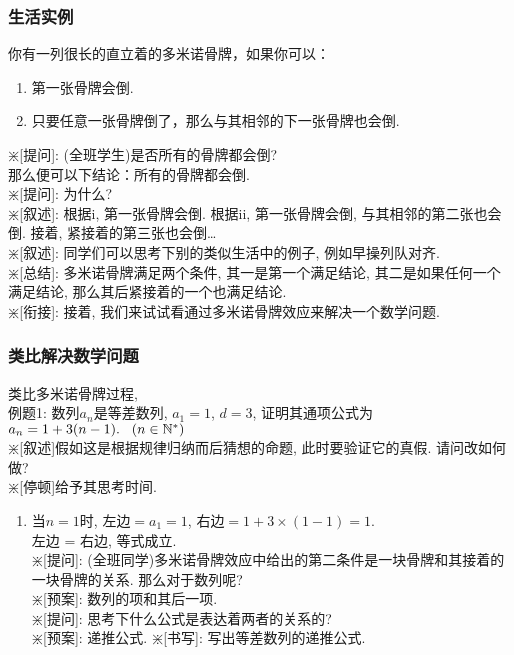 \documentclass{article}
\begin{document}
\begin{CJK}{UTF8}{gkai}
\subsubsection{生活实例}
你有一列很长的直立着的多米诺骨牌，如果你可以：
\begin{enumerate}[i]
\item 第一张骨牌会倒.
\item 只要任意一张骨牌倒了，那么与其相邻的下一张骨牌也会倒.
\end{enumerate}
$\divideontimes$[提问]: (全班学生)是否所有的骨牌都会倒?\\
那么便可以下结论：所有的骨牌都会倒.\\
$\divideontimes$[提问]: 为什么?\\
$\divideontimes$[叙述]: 根据i, 第一张骨牌会倒. 根据ii, 第一张骨牌会倒, 与其相邻的第二张也会倒. 接着, 紧接着的第三张也会倒\dots\\
$\divideontimes$[叙述]: 同学们可以思考下别的类似生活中的例子, 例如早操列队对齐.\\
$\divideontimes$[总结]: 多米诺骨牌满足两个条件, 其一是第一个满足结论, 其二是如果任何一个满足结论, 那么其后紧接着的一个也满足结论.\\
$\divideontimes$[衔接]: 接着, 我们来试试看通过多米诺骨牌效应来解决一个数学问题. 

\subsubsection{类比解决数学问题}
类比多米诺骨牌过程, \\例题1: 数列${a_n}$是等差数列, $a_1 = 1$, $d=3$, 证明其通项公式为$a_n = 1 + 3(n-1).\hspace{3mm}(n \in \mathbb{N}^*)$ \\
$\divideontimes$[叙述]假如这是根据规律归纳而后猜想的命题, 此时要验证它的真假. 请问改如何做? \\
$\divideontimes$[停顿]给予其思考时间.\\
\begin{enumerate}[i]
\item 当$n = 1$时, 左边$= a_1 = 1$, 右边$= 1 + 3 \times (1-1) = 1$.\\左边 = 右边, 等式成立.\\
$\divideontimes$[提问]: (全班同学)多米诺骨牌效应中给出的第二条件是一块骨牌和其接着的一块骨牌的关系. 那么对于数列呢?\\
$\divideontimes$[预案]: 数列的项和其后一项.\\
$\divideontimes$[提问]: 思考下什么公式是表达着两者的关系的?  \\
$\divideontimes$[预案]: 递推公式.
$\divideontimes$[书写]: 写出等差数列的递推公式.


\end{enumerate}
\end{CJK}
\end{document}
